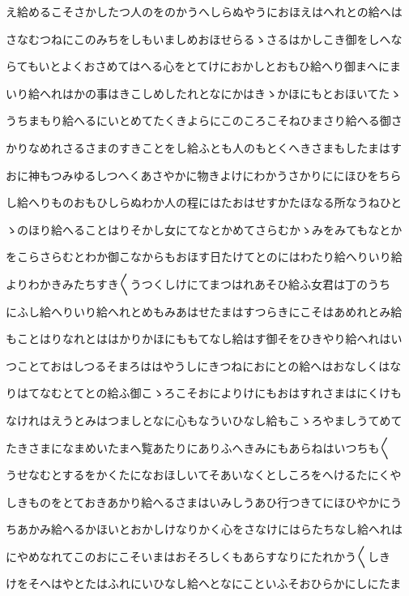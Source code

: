 \documentclass[a4paper,11pt,landscape]{ltjtarticle}
\begin{document}
え給めるこそさかしたつ人のをのかうへしらぬやうにおほえはへれとの給へは
\par\medskip
さなむつねにこのみちをしもいましめおほせらるゝさるはかしこき御をしへな
\par\medskip
らてもいとよくおさめてはへる心をとてけにおかしとおもひ給へり御まへにま
\par\medskip
いり給へれはかの事はきこしめしたれとなにかはきゝかほにもとおほいてたゝ
\par\medskip
うちまもり給へるにいとめてたくきよらにこのころこそねひまさり給へる御さ
\par\medskip
かりなめれさるさまのすきことをし給ふとも人のもとくへきさまもしたまはす
\par\medskip
おに神もつみゆるしつへくあさやかに物きよけにわかうさかりににほひをちら
\par\medskip
し給へりものおもひしらぬわか人の程にはたおはせすかたほなる所なうねひと
\par\medskip
ゝのほり給へることはりそかし女にてなとかめてさらむかゝみをみてもなとか
\par\medskip
をこらさらむとわか御こなからもおほす日たけてとのにはわたり給へりいり給
\par\medskip
よりわかきみたちすき〱うつくしけにてまつはれあそひ給ふ女君は丁のうち
\par\medskip
にふし給へりいり給へれとめもみあはせたまはすつらきにこそはあめれとみ給
\par\medskip
もことはりなれとははかりかほにももてなし給はす御そをひきやり給へれはい
\par\medskip
つことておはしつるそまろははやうしにきつねにおにとの給へはおなしくはな
\par\medskip
りはてなむとてとの給ふ御こゝろこそおによりけにもおはすれさまはにくけも
\par\medskip
なけれはえうとみはつましとなに心もなういひなし給もこゝろやましうてめて
\par\medskip
たきさまになまめいたまへ覧あたりにありふへきみにもあらねはいつちも〱
\par\medskip
うせなむとするをかくたになおほしいてそあいなくとしころをへけるたにくや
\par\medskip
しきものをとておきあかり給へるさまはいみしうあひ行つきてにほひやかにう
\par\medskip
ちあかみ給へるかほいとおかしけなりかく心をさなけにはらたちなし給へれは
\par\medskip
にやめなれてこのおにこそいまはおそろしくもあらすなりにたれかう〱しき
\par\medskip
けをそへはやとたはふれにいひなし給へとなにこといふそおひらかにしにたま
\end{document}
